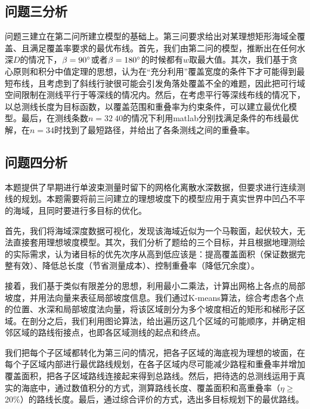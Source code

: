 \documentclass{article}
\begin{document}
\subsection{问题三分析}
	问题三建立在第二问所建立模型的基础上。第三问要求给出对某理想矩形海域全覆盖、且满足覆盖率要求的最优布线。首先，我们由第二问的模型，推断出在任何水深$D$的情况下，$\beta=90^\circ$或者$\beta = 180^\circ$的时候都有$w$取最大值。其次，我们基于贪心原则和积分中值定理的思想，认为在“充分利用”覆盖宽度的条件下才可能得到最短布线，且考虑到了斜线行驶很可能会引发角落处覆盖不全的难题，因此把可行域空间限制在测线平行于等深线的情况内。然后，在考虑平行等深线布线的情况下，以总测线长度为目标函数，以覆盖范围和重叠率为约束条件，可以建立最优化模型。最后，在测线条数$n=32~40$的情况下利用matlab分别找满足条件的布线最优解，在$n=34$时找到了最短路径，并给出了各条测线之间的重叠率。
	

\subsection{问题四分析}
	本题提供了早期进行单波束测量时留下的网格化离散水深数据，但要求进行连续测线的规划。本题需要将前三问建立的理想坡度下的模型应用于真实世界中凹凸不平的海域，且同时要进行多目标的优化。
	\par 首先，我们将海域深度数据可视化，发现该海域近似为一个马鞍面，起伏较大，无法直接套用理想坡度模型。其次，我们分析了题给的三个目标，并且根据地理测绘的实际需求，认为诸目标的优先次序从高到低应该是：提高覆盖面积（保证数据完整有效）、降低总长度（节省测量成本）、控制重叠率（降低冗余度）。
	\par 接着，我们基于类似有限差分的思想，利用最小二乘法，计算出网格上各点的局部坡度，并用法向量来表征局部坡度信息。我们通过K-means算法，综合考虑各个点的位置、水深和局部坡度法向量，将该区域剖分为多个坡度相近的矩形和梯形子区域。在剖分之后，我们利用图论算法，给出遍历这几个区域的可能顺序，并确定相邻区域的路线衔接点，也即各区域测线的起点和终点。
	\par 我们把每个子区域都转化为第三问的情况，把各子区域的海底视为理想的坡面，在每个子区域内部进行最优路线规划，在各子区域内尽可能减少路程和重叠率并增加覆盖面积，把各子区域路线连接起来得到总路线。然后，把待选的总测线运用于真实的海底中，通过数值积分的方式，测算路线长度、覆盖面积和高重叠率（$\eta \ge$ 20$\%$）的路线长度。最后，通过综合评价的方式，选出多目标规划下的最优路线。
\end{document}

